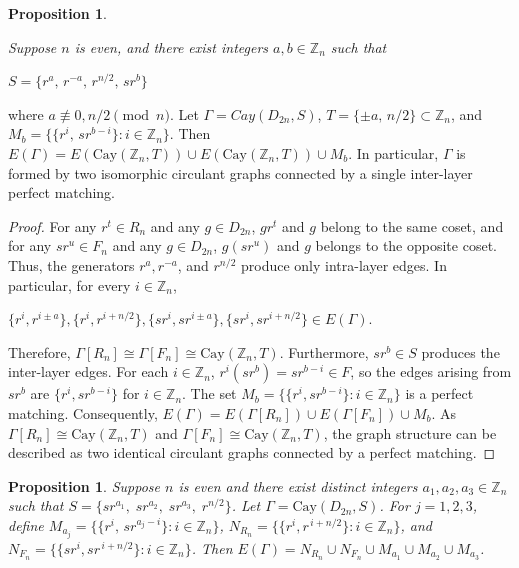 \documentclass[12pt,reqno,a4paper]{amsart}
\theoremstyle{definition}
\newtheorem{prop}[defn]{Proposition}
\begin{document}
\begin{prop}\label{Proposition 6.1}
{\em Suppose $n$ is even, and there exist integers $a,b \in \mathbb{Z}_n$ such that
\begin{center}
$S=\{r^a,\, r^{-a},\, r^{n/2},\, sr^b\}$     
\end{center}

where $a\not\equiv 0, n/2 \pmod n$.
Let $\Gamma=Cay(D_{2n},S)$,
$T=\{\pm a,\, n/2\} \subset \mathbb{Z}_n$, and
$M_b=\{\{r^i,\, sr^{b-i}\} : i \in \mathbb{Z}_n\}$.
Then $E(\Gamma)= E(\mathrm{Cay}(\mathbb{Z}_n, T)) \cup E(\mathrm{Cay}(\mathbb{Z}_n, T)) \cup M_b$. 
In particular, $\Gamma$ is formed by two
isomorphic circulant graphs connected by a single inter-layer perfect matching.
}
\end{prop}

\begin{proof}
For any $r^t\in R_{n}$ and any $g\in D_{2n}$, $gr^t$ and $g$ belong to the same coset, and for any $sr^u\in F_{n}$ and any $g\in D_{2n}$, $g(sr^u)$ and $g$ belongs to the opposite coset. Thus, the generators $r^a, r^{-a}$, and $r^{n/2}$ produce only intra-layer edges. In particular, for every $i\in \mathbb{Z}_n$,
\begin{center}
$\{r^i, r^{i\pm a}\}, \{r^i, r^{i+n/2}\}, \{sr^i, sr^{i\pm a}\}, \{sr^i, sr^{i+n/2}\} \in E(\Gamma)$.
\end{center}
Therefore, $\Gamma[R_{n}] \cong \Gamma[F_{n}] \cong \mathrm{Cay}(\mathbb{Z}_n,T)$.
Furthermore, $sr^b \in S$ produces the inter-layer edges. For each $i\in \mathbb{Z}_n$,
$r^i (sr^b) = sr^{b-i} \in F$,
so the edges arising from $sr^b$ are 
$\{r^i, sr^{b-i}\}$ for $i\in \mathbb{Z}_n$.
The set $M_b=\{\{r^i, sr^{b-i}\}: i\in \mathbb{Z}_n\}$ is a perfect matching.
Consequently,
$E(\Gamma )=E(\Gamma [R_{n}])\cup E(\Gamma [F_{n}])\cup M_{b}$. As $\Gamma [R_{n}]\cong \mathrm{Cay}(\mathbb{Z}_{n},T)$ and $\Gamma [F_{n}]\cong \mathrm{Cay}(\mathbb{Z}_{n},T)$, the graph structure can be described as two identical circulant graphs connected by a perfect matching.
 \end{proof}
\begin{prop}\label{Proposition 6.2}
{\em 
Suppose \(n\) is even and there exist distinct integers \(a_1,a_2,a_3\in\mathbb{Z}_n\) such that 
$S=\{sr^{a_1},\; sr^{a_2},\; sr^{a_3},\; r^{n/2}\}$.
Let \(\Gamma=\mathrm{Cay}(D_{2n},S)\).
For \(j=1,2,3\), define $M_{a_j}=\bigl\{\{r^i,\,sr^{a_j-i}\}:i\in\mathbb{Z}_n\bigr\}$,
$N_{R_{n}}=\bigl\{\{r^i,r^{\,i+n/2}\}:i\in\mathbb{Z}_n\bigr\}$, and $N_{F_{n}}=\bigl\{\{sr^i,sr^{\,i+n/2}\}:i\in\mathbb{Z}_n\bigr\}$.
Then $E(\Gamma) = N_{R_{n}}\cup N_{F_{n}}\cup M_{a_1}\cup M_{a_2}\cup M_{a_3}$.}
\end{prop}
\end{document}
